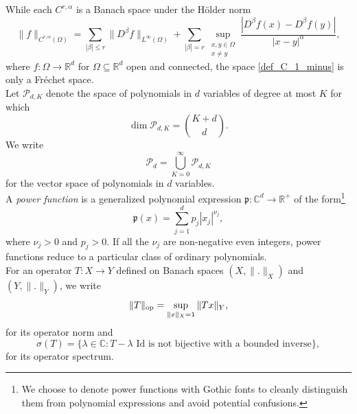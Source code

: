 \documentclass{amsart}
\theoremstyle{plain}
\theoremstyle{definition}
\begin{document}
While each $C^{r,\alpha}$ is a Banach space under the H\"{o}lder norm 
\begin{equation}\label{def_C_r_norm}
\|f\|_{C^{r,\alpha}(\Omega)}
=
\sum_{|\beta|\leq r}\|D^\beta f\|_{L^\infty(\Omega)}
+
\sum_{|\beta|=r}
\sup_{\substack{x,y\in\Omega\\ x\neq y}}
\frac{|D^\beta f(x)-D^\beta f(y)|}{|x-y|^\alpha},
\end{equation}
where $f:\Omega\to\mathbb{R}^d$ for $\Omega\subseteq\mathbb{R}^d$ open and connected, the space \eqref{def_C_1_minus} is only a Fr\'{e}chet space.\\
Let $\mathcal{P}_{d,K}$ denote the space of polynomials in $d$ variables of degree at most $K$ for which  
\begin{equation}
\dim \mathcal{P}_{d,K} = \binom{K+d}{d}.
\end{equation}
We write
\begin{equation}
\mathcal{P}_d = \bigcup_{K = 0}^\infty  \mathcal{P}_{d,K}
\end{equation}
for the vector space of polynomials in $d$ variables.  \\
A \emph{power function} is a generalized polynomial expression $\mathfrak{p}:\mathbb{C}^d\to \mathbb{R}^+$ of the form\footnote{We choose to denote power functions with Gothic fonts to cleanly distinguish them from polynomial expressions and avoid potential confusions.}
\begin{equation}\label{defpower}
    \mathfrak{p}(x) = \sum_{j=1}^d p_j  |x_j|^{\nu_j},
\end{equation}
where $\nu_j>0$ and $p_j>0$. If all the $\nu_j$ are non-negative even integers, power functions reduce to a particular class of ordinary polynomials.\\
For an operator $T:X\to Y$ defined on Banach spaces $(X,\|.\|_X)$ and $(Y,\|.\|_Y)$, we write
\begin{equation}
    \|T\|_{\rm op} = \sup_{\|x\|_{X}=1} \|Tx\|_{Y},
\end{equation}
for its operator norm and 
\begin{equation}
    \sigma(T) = \{\lambda \in \mathbb{C}: T-\lambda \text{ Id} \text{ is not bijective with a bounded inverse}\},
\end{equation}
for its operator spectrum. 
\end{document}
